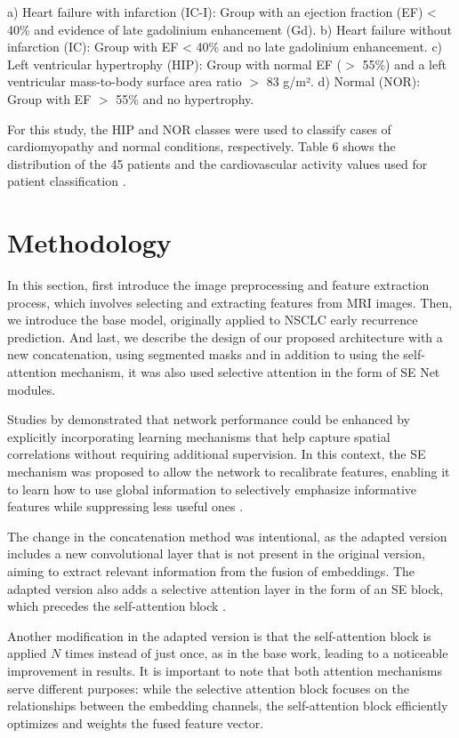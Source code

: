 \documentclass[journal,twoside,web]{ieeecolor}
\begin{document}
a) Heart failure with infarction (IC-I): Group with an ejection fraction (EF) < 40\% and evidence of late gadolinium enhancement (Gd).  
b) Heart failure without infarction (IC): Group with EF < 40\% and no late gadolinium enhancement.  
c) Left ventricular hypertrophy (HIP): Group with normal EF ($>$ 55\%) and a left ventricular mass-to-body surface area ratio $>$ 83 g/m².  
d) Normal (NOR): Group with EF $>$ 55\% and no hypertrophy.  

For this study, the HIP and NOR classes were used to classify cases of cardiomyopathy and normal conditions, respectively. Table 6 shows the distribution of the 45 patients and the cardiovascular activity values used for patient classification .

\section{Methodology}

In this section, first introduce the image preprocessing and feature extraction process, which involves selecting and extracting features from \gls{MRI} images. Then, we introduce the base model, originally applied to \gls{NSCLC} early recurrence prediction. And last, we describe the design of our proposed architecture with a new concatenation, using segmented masks and in addition to using the self-attention mechanism, it was also used selective attention in the form of \gls{SE} Net modules. 

Studies by \cite{huSqueezeandExcitationNetworks2018} demonstrated that network performance could be enhanced by explicitly incorporating learning mechanisms that help capture spatial correlations without requiring additional supervision.  In this context, the \gls{SE} mechanism was proposed to allow the network to recalibrate features, enabling it to learn how to use global information to selectively emphasize informative features while suppressing less useful ones \cite{lecunHandwrittenDigitRecognition1989}.

The change in the concatenation method was intentional, as the adapted version includes a new convolutional layer that is not present in the original version, aiming to extract relevant information from the fusion of embeddings. The adapted version also adds a selective attention layer in the form of an \gls{SE} block, which precedes the self-attention block \cite{osheaIntroductionConvolutionalNeural2015c}.  

Another modification in the adapted version is that the self-attention block is applied $N$ times instead of just once, as in the base work, leading to a noticeable improvement in results. It is important to note that both attention mechanisms serve different purposes: while the selective attention block focuses on the relationships between the embedding channels, the self-attention block efficiently optimizes and weights the fused feature vector.  
\end{document}
